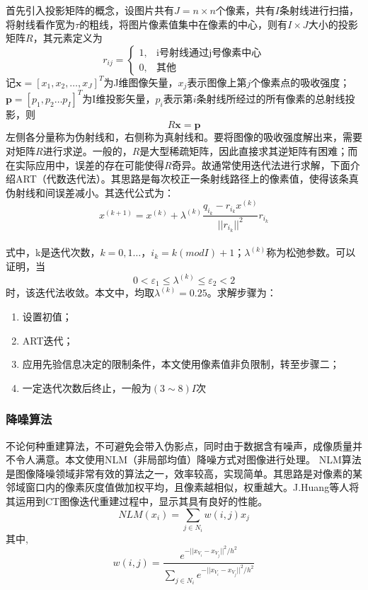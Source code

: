 \documentclass{myart}
\begin{document}
首先引入投影矩阵的概念，设图片共有\(J = n\times n\)个像素，共有$I$条射线进行扫描，将射线看作宽为\(\tau\)的粗线，将图片像素值集中在像素的中心，则有\(I\times J\)大小的投影矩阵$R$，其元素定义为
\[r_{ij}=
\begin{cases}
1 ,& \text{i号射线通过j号像素中心}\\
0 ,& \text{其他}
\end{cases}\]
%
%
记$\textbf{x}=[x_{1},x_{2} ,\ldots ,x_{J}]^T$为J维图像矢量，\(x_j\)表示图像上第\(j\)个像素点的吸收强度；$\textbf{p}=[p_{1},p_{2} \ldots p_{I}]^T$为I维投影矢量，$p_i$表示第\(i\)条射线所经过的所有像素的总射线投影，则
\[R\textbf{x}=\textbf{p}\]
左侧各分量称为伪射线和，右侧称为真射线和。要将图像的吸收强度解出来，需要对矩阵$R$进行求逆。一般的，$R$是大型稀疏矩阵，因此直接求其逆矩阵有困难；而在实际应用中，误差的存在可能使得$R$奇异。故通常使用迭代法进行求解，下面介绍ART（代数迭代法）。其思路是每次校正一条射线路径上的像素值，使得该条真伪射线和间误差减小。其迭代公式为：
\[x^{(k+1)}=x^{(k)}+\lambda^{(k)}\frac{q_{i_{k}}-r_{i_{k}}x^{(k)}}{||r_{i_{k}}||^{2}}r_{i_{k}}\]\\
式中，k是迭代次数，$k=0,1 \ldots$，$i_{k}=k(modI)+1$；$\lambda^{(k)}$称为松弛参数。可以证明，当\[0<\varepsilon_{1} \leq \lambda^{(k)} \leq \varepsilon_{2}<2\]
时，该迭代法收敛。本文中，均取$\lambda^{(k)}=0.25$。求解步骤为：
\begin{enumerate}
\item 设置初值；
\item ART迭代；
\item 应用先验信息决定的限制条件，本文使用像素值非负限制，转至步骤二；
\item 一定迭代次数后终止，一般为$(3\sim8)I$次
\end{enumerate}

\subsubsection{降噪算法}
不论何种重建算法，不可避免会带入伪影点，同时由于数据含有噪声，成像质量并不令人满意。本文使用NLM（非局部均值）降噪方式对图像进行处理。 NLM算法是图像降噪领域非常有效的算法之一，效率较高，实现简单。其思路是对像素的某邻域窗口内的像素灰度值做加权平均，且像素越相似，权重越大。J.Huang等人将其运用到CT图像迭代重建过程中，显示其具有良好的性能。\cite{nlm}
\[NLM(x_{i})=\sum_{j\in N_{i}} w(i,j)x_{j} \]
其中,\[w(i,j)=\frac{e^{-||x_{V_{i}}-x_{V_{j}}||^2/h^2}}{\sum_{j\in N_{i}}e^{-||x_{V_{i}}-x_{V_{j}}||^2/h^2}}\]
\end{document}
